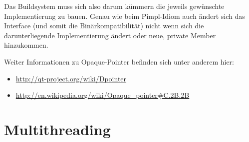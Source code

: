 \documentclass[12pt, a4paper, titlepage, hidelinks]{scrreprt}
\begin{document}

Das Buildsystem muss sich also darum kümmern die jeweils gewünschte Implementierung zu bauen. Genau wie beim Pimpl-Idiom auch ändert sich das Interface (und somit die Binärkompatibilität) nicht wenn sich die darunterliegende Implementierung ändert oder neue, private Member hinzukommen.

Weiter Informationen zu Opaque-Pointer befinden sich unter anderem hier:
\begin{itemize}
\item \url{http://qt-project.org/wiki/Dpointer}
\item \url{http://en.wikipedia.org/wiki/Opaque_pointer#C.2B.2B}
\end{itemize}

\section{Multithreading}
\end{document}

